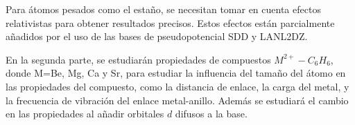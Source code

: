 \documentclass[12pt]{article}
\begin{document}
Para átomos pesados como el estaño, se necesitan tomar en cuenta efectos relativistas para obtener resultados precisos. Estos efectos están parcialmente añadidos por el uso de las bases de pseudopotencial SDD y LANL2DZ.

En la segunda parte, se estudiarán propiedades de compuestos $M^{2+}-C_6H_6$, donde M=Be, Mg, Ca y Sr, para estudiar la influencia del tamaño del átomo en las propiedades del compuesto, como la distancia de enlace, la carga del metal, y la frecuencia de vibración del enlace metal-anillo. Además se estudiará el cambio en las propiedades al añadir orbitales $d$ difusos a la base.



%
%
\end{document}
